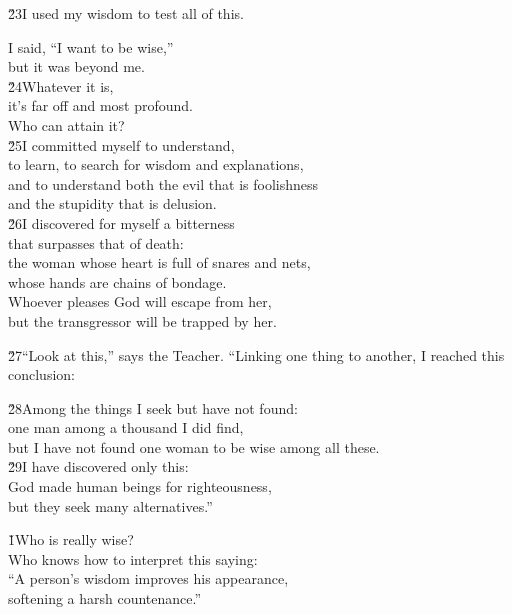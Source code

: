 \v{23}I used my wisdom to test all of this.

\begin{poetry}
\poeml I said, ``I want to be wise,'' \\
\poemll    but it was beyond me. \\
\poeml \v{24}Whatever it is, \\
\poemll    it's far off and most profound. \\
\poemlll       Who can attain it? \\
\poeml \v{25}I committed myself to understand, \\
\poemlll       to learn, to search for wisdom and explanations, \\
\poeml and to understand both the evil that is foolishness \\
\poemll    and the stupidity that is delusion. \\
\poeml \v{26}I discovered for myself a bitterness \\
\poemll    that surpasses that of death: \\
\poeml the woman whose heart is full of snares and nets, \\
\poemll    whose hands are chains of bondage. \\
\poeml Whoever pleases God will escape from her, \\
\poemll    but the transgressor will be trapped by her.
\end{poetry}

\v{27}``Look at this,'' says the Teacher. ``Linking one thing to another, I reached this conclusion:

\begin{poetry}
\poeml \v{28}Among the things I seek but have not found: \\
\poemll    one man among a thousand I did find, \\
\poemlll       but I have not found one woman to be wise among all these. \\
\poeml \v{29}I have discovered only this: \\
\poemll    God made human beings for righteousness, \\
\poemlll       but they seek many alternatives.''
\end{poetry}

\begin{poetry}
\poeml {}
\v{1}Who is really wise? \\
\poeml Who knows how to interpret this saying: \\
\poeml ``A person's wisdom improves his appearance, \\
\poemll    softening a harsh countenance.''
\end{poetry}

